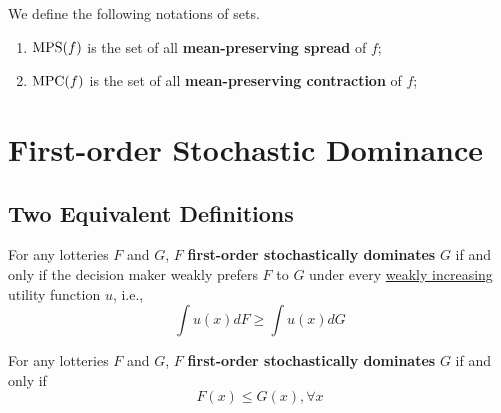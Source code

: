\documentclass[11pt]{elegantbook}
\begin{document}
\begin{definition}
    \normalfont
    We define the following notations of sets.
    \begin{enumerate}[$\circ$]
        \item $\textnormal{MPS}(f)$ is the set of all \textbf{mean-preserving spread} of $f$;
        \item $\textnormal{MPC}(f)$ is the set of all \textbf{mean-preserving contraction} of $f$;
    \end{enumerate}
\end{definition}

\section{First-order Stochastic Dominance}
\subsection{Two Equivalent Definitions}
\begin{definition}
    \normalfont
    For any lotteries $F$ and $G$, $F$ \textbf{first-order stochastically dominates} $G$ if and only if the decision maker weakly prefers $F$ to $G$ under every \underline{weakly increasing} utility function $u$, i.e.,
    $$\int u (x) dF \geq \int u(x) dG$$
\end{definition}

\begin{definition}
    \normalfont
    For any lotteries $F$ and $G$, $F$ \textbf{first-order stochastically dominates} $G$ if and only if
    $$F(x)\leq G(x),\forall x$$
\end{definition}
\end{document}
